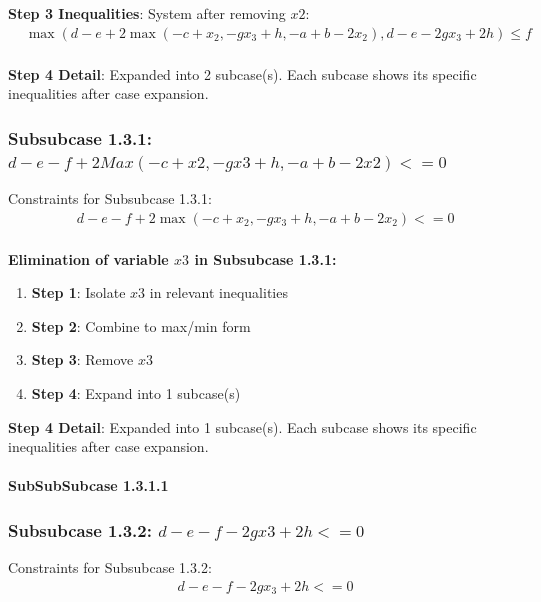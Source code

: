 \documentclass{article}
\begin{document}
\textbf{Step 3 Inequalities}: System after removing $x2$:
\begin{align}
& \max\left(d - e + 2 \max\left(- c + x_{2}, - g x_{3} + h, - a + b - 2 x_{2}\right), d - e - 2 g x_{3} + 2 h\right) \leq f \\
\end{align}

\textbf{Step 4 Detail}: Expanded into 2 subcase(s).
Each subcase shows its specific inequalities after case expansion.

\subsubsection{Subsubcase 1.3.1: $d - e - f + 2 Max(-c + x2, -g x3 + h, -a + b - 2 x2) <= 0$}

Constraints for Subsubcase 1.3.1:
\begin{align}
& d - e - f + 2 \max\left(- c + x_{2}, - g x_{3} + h, - a + b - 2 x_{2}\right) <= 0 \\
\end{align}

\textbf{Elimination of variable $x3$ in Subsubcase 1.3.1:}

\begin{enumerate}
\item \textbf{Step 1}: Isolate $x3$ in relevant inequalities
\item \textbf{Step 2}: Combine to max/min form
\item \textbf{Step 3}: Remove $x3$
\item \textbf{Step 4}: Expand into 1 subcase(s)
\end{enumerate}

\textbf{Step 4 Detail}: Expanded into 1 subcase(s).
Each subcase shows its specific inequalities after case expansion.

\paragraph{SubSubSubcase 1.3.1.1}

\subsubsection{Subsubcase 1.3.2: $d - e - f - 2 g x3 + 2 h <= 0$}

Constraints for Subsubcase 1.3.2:
\begin{align}
& d - e - f - 2 g x_{3} + 2 h <= 0 \\
\end{align}
\end{document}
